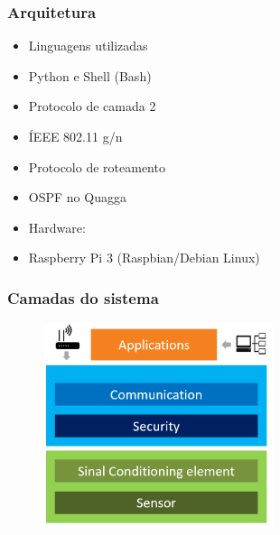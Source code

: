 
\begin{frame}
\frametitle{Arquitetura}
\begin{itemize}
	\item Linguagens utilizadas
	\item Python e Shell (Bash)
	\item Protocolo de camada 2
	\item ÍEEE 802.11 g/n
	\item Protocolo de roteamento
	\item OSPF no Quagga
	\item Hardware:
	\item Raspberry Pi 3 (Raspbian/Debian Linux)
\end{itemize}

\end{frame}


\begin{frame}
	\frametitle{Camadas do sistema}

	\begin{figure}[h]
		\centering
		\includegraphics[width=0.6\textwidth]{"../Relatorio/Artigo IoT-G4/figs/system-layer"}
		\label{System-Layers}
 	\end{figure}

\end{frame}


